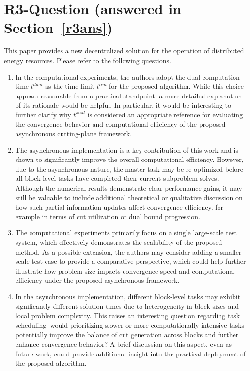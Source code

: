 \documentclass[11pt]{article}
\newcommand{\sect}[1]{\textbf{Section}~\ref{#1}}
\begin{document}
\section{R3-Question (answered in \sect{r3ans})}
This paper provides a new decentralized solution for the operation of distributed energy resources. Please refer to the following questions.
\begin{enumerate}
    \item In the computational experiments, the authors adopt the dual computation time $t^{dual}$ as the time limit $t^{lim}$ for the proposed algorithm. While this choice appears reasonable from a practical standpoint, a more detailed explanation of its rationale would be helpful. In particular, it would be interesting to further clarify why $t^{dual}$ is considered an appropriate reference for evaluating the convergence behavior and computational efficiency of the proposed asynchronous cutting-plane framework.
    \item The asynchronous implementation is a key contribution of this work and is shown to significantly improve the overall computational efficiency. However, due to the asynchronous nature, the master task may be re-optimized before all block-level tasks have completed their current subproblem solves. Although the numerical results demonstrate clear performance gains, it may still be valuable to include additional theoretical or qualitative discussion on how such partial information updates affect convergence efficiency, for example in terms of cut utilization or dual bound progression.
    \item The computational experiments primarily focus on a single large-scale test system, which effectively demonstrates the scalability of the proposed method. As a possible extension, the authors may consider adding a smaller-scale test case to provide a comparative perspective, which could help further illustrate how problem size impacts convergence speed and computational efficiency under the proposed asynchronous framework.
    \item In the asynchronous implementation, different block-level tasks may exhibit significantly different solution times due to heterogeneity in block sizes and local problem complexity. This raises an interesting question regarding task scheduling: would prioritizing slower or more computationally intensive tasks potentially improve the balance of cut generation across blocks and further enhance convergence behavior? A brief discussion on this aspect, even as future work, could provide additional insight into the practical deployment of the proposed algorithm.
\end{enumerate}
\end{document}

